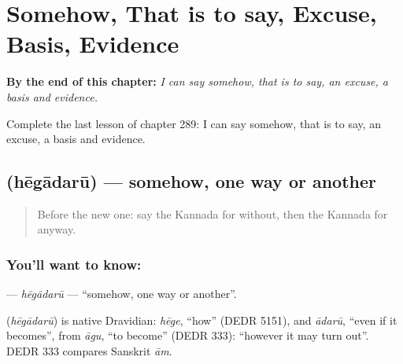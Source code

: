 
\chapter{Somehow, That is to say, Excuse, Basis, Evidence}
\label{ch:ka-somehow-that-is-to-say-excuse-basis-evidence}

\begin{chapteropening}
\textbf{By the end of this chapter:} \emph{I can say somehow, that is to say, an excuse, a basis and evidence.}

Complete the last lesson of chapter 289: I can say somehow, that is to say, an excuse, a basis and evidence.
\end{chapteropening}

\section[\texorpdfstring{\kn{ಹೇಗಾದರೂ} (hēgādarū)}{ಹೇಗಾದರೂ (hēgādarū)}]{ (hēgādarū) — somehow, one way or another}

\label{lesson:KA-C289-hegadaru}



\begin{quote}
Before the new one: say the Kannada for without, then the Kannada for anyway.
\end{quote}

\subsection*{You'll want to know: }
\textbf{} — \emph{hēgādarū} — \textquotedblleft{}somehow, one way or another\textquotedblright{}.

\begin{cousinweb}
\textbf{} (\emph{hēgādarū}) is native Dravidian: \emph{hēge}, \textquotedblleft{}how\textquotedblright{} (DEDR 5151), and \emph{ādarū}, \textquotedblleft{}even if it becomes\textquotedblright{}, from \emph{āgu}, \textquotedblleft{}to become\textquotedblright{} (DEDR 333): \textquotedblleft{}however it may turn out\textquotedblright{}. DEDR 333 compares Sanskrit \emph{ām}.
\end{cousinweb}

